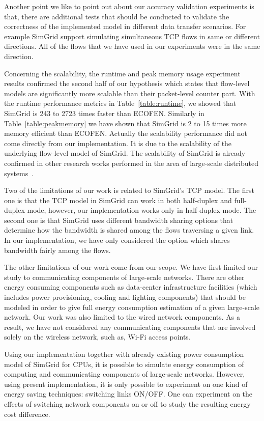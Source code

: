 Another point we like to point out about our accuracy validation experiments is that, there are additional tests that should be conducted to validate the correctness of the implemented model in different data transfer scenarios. For example SimGrid support simulating simultaneous TCP flows in same or different directions. All of the flows that we have used in our experiments were in the same direction. 

Concerning the scalability, the runtime and peak memory usage experiment results confirmed the second half of our hypothesis which states that flow-level models are significantly more scalable than their packet-level counter part. With the runtime performance metrics in Table~\ref{table:runtime}, we showed that SimGrid is 243 to 2723 times faster than ECOFEN. Similarly in Table~\ref{table:peakmemory} we have shown that SimGrid is 2 to 15 times more memory efficient than ECOFEN. Actually the scalability performance did not come directly from our implementation. It is due to the scalability of the underlying flow-level model of SimGrid. The scalability of SimGrid is already confirmed in other research works performed in the area of large-scale distributed systems~\cite{DBLP:conf/ccgrid/QuinsonRT12,DBLP:journals/jpdc/CasanovaGLQS14}.

Two of the limitations of our work is related to SimGrid's TCP model. The first one is that the TCP model in SimGrid can work in both half-duplex and full-duplex mode, however, our implementation works only in half-duplex mode. The second one  is that SimGrid uses different bandwidth sharing options that determine how the bandwidth is shared among the flows traversing a given link. In our implementation, we have only considered the option which shares bandwidth fairly among the flows. 

The other limitations of our work come from our scope. We have first limited our study to communicating components of large-scale networks. There are other energy consuming components such as data-center infrastructure facilities (which includes power provisioning, cooling and lighting components) that should be modeled in order to give full energy consumption estimation of a given large-scale network. Our work was also limited to the wired network components. As a result, we have not considered any communicating components that are involved solely on the wireless network, such as, Wi-Fi access points. 

Using our implementation together with already existing power consumption model of SimGrid for CPUs, it is possible to simulate energy consumption of computing and communicating components of large-scale networks. However, using present implementation, it is only possible to experiment on one kind of energy saving techniques: switching links ON/OFF. One can experiment on the effects of switching network components on or off to study the resulting energy cost difference. 

